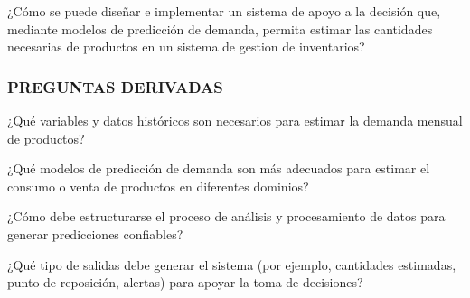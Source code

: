 ¿Cómo se puede diseñar e implementar un sistema de apoyo a la decisión que, mediante modelos de predicción de demanda, permita estimar las cantidades necesarias de productos en un sistema de gestion de inventarios?



    
    
    

\subsubsection{PREGUNTAS DERIVADAS}

¿Qué variables y datos históricos son necesarios para estimar la demanda mensual de productos?

¿Qué modelos de predicción de demanda son más adecuados para estimar el consumo o venta de productos en diferentes dominios?

¿Cómo debe estructurarse el proceso de análisis y procesamiento de datos para generar predicciones confiables?

¿Qué tipo de salidas debe generar el sistema (por ejemplo, cantidades estimadas, punto de reposición, alertas) para apoyar la toma de decisiones?
